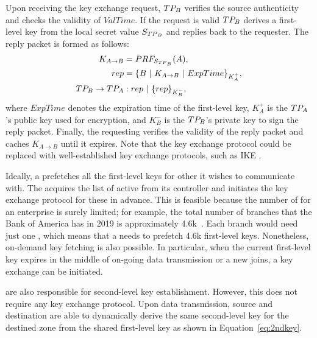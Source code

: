 Upon receiving the key exchange request, $TP_B$ verifies the source authenticity and 
checks the validity of $ValTime$. If the request is valid $TP_B$ derives a 
first-level key from the local secret value $S_{{TP}_B}$ and replies back to the requester.
The reply packet is formed as follows: 
\noindent 
\begin{subequations}
	\begin{align}
		K_{A \rightarrow B}     & = PRF_{S_{{TP}_B}}(A),                          \\
		rep                     & = \{B~|~K_{A \rightarrow B}~|~ExpTime\}_{K^+_A}, \\
		TP_B \rightarrow TP_A & : rep~|~\{rep\}_{K^-_B},                         
		\label{eq:rep}
	\end{align}
\end{subequations}
\noindent 
where $ExpTime$ denotes the expiration time of the first-level key, $K^+_A$ is the 
$TP_A$'s public key used for encryption, and $K^-_B$ is the $TP_B$'s private key to 
sign the reply packet. Finally, the requesting \tp verifies the validity of the reply
packet and caches $K_{A \rightarrow B}$ until it expires. 
Note that the key exchange
protocol could be replaced with well-established key exchange protocols, such as IKE 
\cite{rfc7296}.

Ideally, a \tp prefetches all the first-level keys for other \tps it wishes to communicate 
with. The \tp acquires the list of active \tps from its controller and initiates the key 
exchange protocol for these \tps in advance. This is feasible because the number of \tps for
an enterprise is surely limited; for example, the total number of branches that the Bank of America has in 2019 is approximately 4.6k~\cite{statista2019boa}. 
Each branch would need just one \tp, which means that a \tp needs
to prefetch 4.6k first-level keys. Nonetheless, on-demand key fetching is also possible. 
In particular, when the current first-level key expires in the middle of on-going data
transmission or a new \tp joins, a key exchange can be initiated.

\tps are also responsible for second-level key establishment. However, this does not 
require any key exchange protocol. Upon data transmission, source and destination \tps 
are able to dynamically derive the same second-level key for the destined zone from the
shared first-level key as shown in Equation~\ref{eq:2ndkey}.





